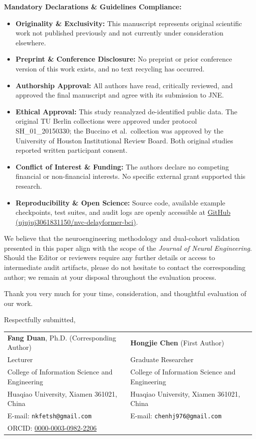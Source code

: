 \documentclass[10pt,a4paper]{article}
\begin{document}
\smallskip
\noindent\textbf{Mandatory Declarations \& Guidelines Compliance:}
\begin{itemize}
  \item \textbf{Originality \& Exclusivity:} This manuscript represents original scientific work not published previously and not currently under consideration elsewhere.
  \item \textbf{Preprint \& Conference Disclosure:} No preprint or prior conference version of this work exists, and no text recycling has occurred.
  \item \textbf{Authorship Approval:} All authors have read, critically reviewed, and approved the final manuscript and agree with its submission to JNE.
  \item \textbf{Ethical Approval:} This study reanalyzed de-identified public data. The original TU Berlin collections were approved under protocol SH\_01\_20150330; the Buccino et al.\ collection was approved by the University of Houston Institutional Review Board. Both original studies reported written participant consent.
  \item \textbf{Conflict of Interest \& Funding:} The authors declare no competing financial or non-financial interests. No specific external grant supported this research.
  \item \textbf{Reproducibility \& Open Science:} Source code, available example checkpoints, test suites, and audit logs are openly accessible at \href{https://github.com/ujujuj3061831150/nvc-delayformer-bci}{GitHub (ujujuj3061831150/nvc-delayformer-bci)}.
\end{itemize}

\smallskip
We believe that the neuroengineering methodology and dual-cohort validation presented in this paper align with the scope of the \textit{Journal of Neural Engineering}. Should the Editor or reviewers require any further details or access to intermediate audit artifacts, please do not hesitate to contact the corresponding author; we remain at your disposal throughout the evaluation process.

\smallskip
\noindent Thank you very much for your time, consideration, and thoughtful evaluation of our work.

\smallskip
\noindent Respectfully submitted,\\[0.5ex]
{\small
\noindent
\begin{tabular}{@{}p{}@{\hfill}p{}@{}}
\textbf{Fang Duan}, Ph.D. (Corresponding Author) & \textbf{Hongjie Chen} (First Author) \\
Lecturer & Graduate Researcher \\
College of Information Science and Engineering & College of Information Science and Engineering \\
Huaqiao University, Xiamen 361021, China & Huaqiao University, Xiamen 361021, China \\
E-mail: \texttt{nkfetsh@gmail.com} & E-mail: \texttt{chenhj976@gmail.com} \\
ORCID: \href{https://orcid.org/0000-0003-0982-2206}{0000-0003-0982-2206} & \\
\end{tabular}
}
\end{document}
